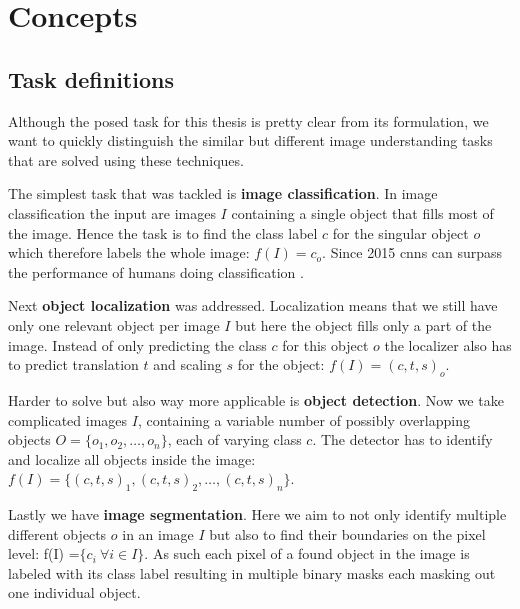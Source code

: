 %
\chapter{Concepts}
\label{sec:concepts}


\section{Task definitions}
\label{sec:concepts:tasks}
Although the posed task for this thesis is pretty clear from its formulation, we want to quickly distinguish the similar but different image understanding tasks that are solved using these techniques.

The simplest task that was tackled is \textbf{image classification}. In image classification the input are images $I$ containing a single object that fills most of the image. Hence the task is to find the class label $c$ for the singular object $o$ which therefore labels the whole image: $f(I) = c_o$. Since 2015 \glspl{cnn} can surpass the performance of humans doing classification \citep{he_delving_2015}.

Next \textbf{object localization} was addressed. Localization means that we still have only one relevant object per image $I$ but here the object fills only a part of the image. Instead of only predicting the class $c$ for this object $o$ the localizer also has to predict translation $t$ and scaling $s$ for the object: $f(I) = (c, t, s)_o$.

Harder to solve but also way more applicable is \textbf{object detection}. Now we take complicated images $I$, containing a variable number of possibly overlapping objects $O = \{o_1,o_2,\dotsc,o_n\}$, each of varying class $c$. The detector has to identify and localize all objects inside the image: $f(I) = \{(c, t, s)_1, (c, t, s)_2,\dotsc,(c, t, s)_n\}$.

Lastly we have \textbf{image segmentation}. Here we aim to not only identify multiple different objects $o$ in an image $I$ but also to find their boundaries on the pixel level: f(I) =$ \{ c_i\ \forall i \in I\}$. As such each pixel of a found object in the image is labeled with its class label resulting in multiple binary masks each masking out one individual object.

